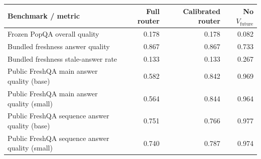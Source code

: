 \begin{tabular}{lrrr}
\toprule
Benchmark / metric & Full router & Calibrated router & No $V_{\text{future}}$ \\
\midrule
Frozen PopQA overall quality & 0.178 & 0.178 & 0.082 \\
Bundled freshness answer quality & 0.867 & 0.867 & 0.733 \\
Bundled freshness stale-answer rate & 0.133 & 0.133 & 0.267 \\
Public FreshQA main answer quality (base) & 0.582 & 0.842 & 0.969 \\
Public FreshQA main answer quality (small) & 0.564 & 0.844 & 0.964 \\
Public FreshQA sequence answer quality (base) & 0.751 & 0.766 & 0.977 \\
Public FreshQA sequence answer quality (small) & 0.740 & 0.787 & 0.974 \\
\bottomrule
\end{tabular}
